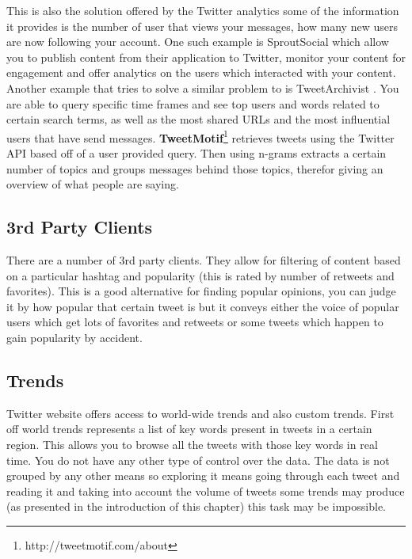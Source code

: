 This is also the solution offered by the Twitter analytics  some of the information it provides is the number of user that views your messages, how many new users are now following your account.
\newline
One such example is SproutSocial  which allow you to publish content from their application to Twitter, monitor your content for engagement and offer analytics on the users which interacted with your content.
\newline
Another example that tries to solve a similar problem to {\project} is TweetArchivist . You are able to query specific time frames and see top users and words related to certain search terms, as well as the most shared URLs and the most influential  users that have send messages.
\newline
\textbf{TweetMotif}\footnote{http://tweetmotif.com/about} retrieves tweets using the Twitter API based off of a user provided query. Then using n-grams extracts a certain number of topics and groups messages behind those topics, therefor giving an overview of what people are saying.

\subsection{3rd Party Clients}
\label{sub-sec:tpc}

There are a number of 3rd party clients. They allow for filtering of content based on a particular hashtag and popularity (this is rated by number of retweets and favorites). This is a good alternative for finding popular opinions, you can judge it by how popular that certain tweet is but it conveys either the voice of popular users which get lots of favorites and retweets or some tweets which happen to gain popularity by accident.

\subsection{Trends}
\label{sub-sec:trends}

Twitter website offers access to world-wide trends and also custom trends. First off world trends represents a list of key words present in tweets in a certain region. This allows you to browse all the tweets with those key words in real time. You do not have any other type of control over the data. The data is not grouped by any other means so exploring it means going through each tweet and reading it and taking into account the volume of tweets some trends may produce (as presented in the introduction of this chapter) this task may be impossible.

